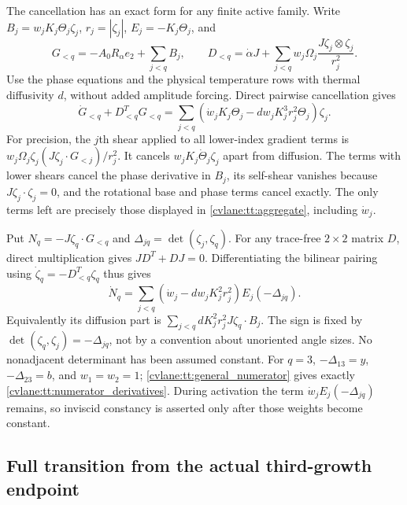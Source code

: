 The cancellation has an exact form for any finite active family.
Write $B_j=w_jK_j\Theta_j\zeta_j$, $r_j=|\zeta_j|$,
$E_j=-K_j\Theta_j$, and
\[
 G_{<q}=-A_0R_\alpha e_2+\sum_{j<q}B_j,\qquad
 D_{<q}=\dot\alpha J+
      \sum_{j<q}w_j\Omega_j\frac{J\zeta_j\otimes\zeta_j}{r_j^2}.
\]
Use the phase equations and the physical temperature rows with
thermal diffusivity $d$, without added amplitude forcing. Direct
pairwise cancellation gives
\begin{equation}\label{cvlane:tt:aggregate}
 \dot G_{<q}+D_{<q}^TG_{<q}
 =\sum_{j<q}(\dot w_jK_j\Theta_j
                  -dw_jK_j^3r_j^2\Theta_j)\zeta_j.
\end{equation}
For precision, the $j$th shear applied to all lower-index gradient
terms is
$w_j\Omega_j\zeta_j(J\zeta_j\cdot G_{<j})/r_j^2$.
It cancels $w_jK_j\dot\Theta_j\zeta_j$ apart from diffusion.
The terms with lower shears cancel the phase derivative in $B_j$,
its self-shear vanishes because $J\zeta_j\cdot\zeta_j=0$,
and the rotational base and phase terms cancel exactly.
The only terms left are precisely those displayed in
\eqref{cvlane:tt:aggregate}, including $\dot w_j$.

Put $N_q=-J\zeta_q\cdot G_{<q}$ and
$\Delta_{jq}=\det(\zeta_j,\zeta_q)$.
For any trace-free $2\times2$ matrix $D$, direct multiplication gives
$JD^T+DJ=0$. Differentiating the bilinear pairing using
$\dot\zeta_q=-D_{<q}^T\zeta_q$ thus gives
\begin{equation}\label{cvlane:tt:general_numerator}
 \dot N_q=
 \sum_{j<q}(\dot w_j-dw_jK_j^2r_j^2)
               E_j(-\Delta_{jq}).
\end{equation}
Equivalently its diffusion part is
$\sum_{j<q}dK_j^2r_j^2J\zeta_q\cdot B_j$.
The sign is fixed by $\det(\zeta_q,\zeta_j)=-\Delta_{jq}$,
not by a convention about unoriented angle sizes.
No nonadjacent determinant has been assumed constant.
For $q=3$, $-\Delta_{13}=y$, $-\Delta_{23}=b$, and $w_1=w_2=1$;
\eqref{cvlane:tt:general_numerator} gives exactly
\eqref{cvlane:tt:numerator_derivatives}. During activation the term
$\dot w_j E_j(-\Delta_{jq})$ remains, so inviscid constancy is
asserted only after those weights become constant.

\subsection{Full transition from the actual third-growth endpoint}

